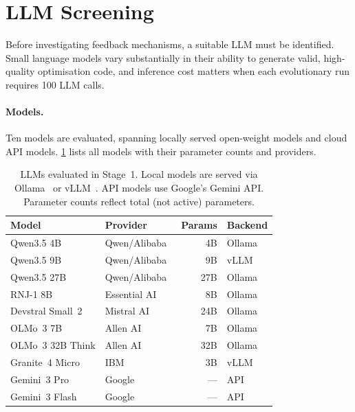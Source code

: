 \section{LLM Screening}
\label{sec:meth-screening}

Before investigating feedback mechanisms, a suitable LLM must be identified. Small language models vary substantially in their ability to generate valid, high-quality optimisation code, and inference cost matters when each evolutionary run requires 100 LLM calls.

\paragraph{Models.}
Ten models are evaluated, spanning locally served open-weight models and cloud API models. \cref{tab:models} lists all models with their parameter counts and providers.

\begin{table}[t]
\centering
\caption{LLMs evaluated in Stage~1. Local models are served via Ollama~\cite{ollama} or vLLM~\cite{kwon2023vllm}. API models use Google's Gemini API. Parameter counts reflect total (not active) parameters.}
\label{tab:models}
\footnotesize
\begin{tabular}{@{}llrl@{}}
\toprule
\textbf{Model} & \textbf{Provider} & \textbf{Params} & \textbf{Backend} \\
\midrule
Qwen3.5 4B   & Qwen/Alibaba~\cite{qwen3}          & 4B  & Ollama \\
Qwen3.5 9B   & Qwen/Alibaba~\cite{qwen3}          & 9B  & vLLM \\
Qwen3.5 27B  & Qwen/Alibaba~\cite{qwen3}          & 27B & Ollama \\
RNJ-1 8B     & Essential AI~\cite{rnj1}            & 8B  & Ollama \\
Devstral Small~2 & Mistral AI~\cite{devstral2}     & 24B & Ollama \\
OLMo~3 7B    & Allen AI~\cite{olmo3}               & 7B  & Ollama \\
OLMo~3 32B Think & Allen AI~\cite{olmo3}           & 32B & Ollama \\
Granite~4 Micro  & IBM~\cite{granite4}             & 3B  & vLLM \\
\midrule
Gemini~3 Pro     & Google~\cite{gemini3pro}      & --- & API \\
Gemini~3 Flash   & Google~\cite{gemini3flash}      & --- & API \\
\bottomrule
\end{tabular}
\end{table}

